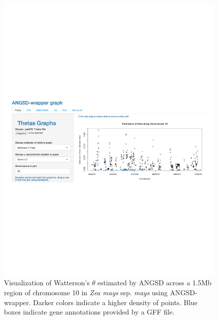 \documentclass[10pt,a4paper]{article}
\begin{document}
\begin{figure}
\centering
\includegraphics[width=0.8\linewidth]{figures/fig1.pdf}
\caption{Visualization of Watterson's $\theta$ estimated by ANGSD across a 1.5Mb region of chromosome 10 in {\it Zea mays} ssp. {\it mays} using ANGSD-wrapper. Darker colors indicate a higher density of points. Blue boxes indicate gene annotations provided by a GFF file. \label{fig:theta} }
\end{figure}
\end{document}
